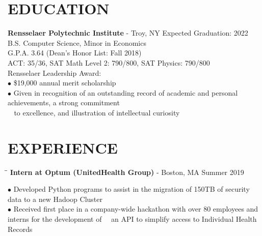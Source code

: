 \documentclass{res}
\begin{document}

\address{\bf  ADDRESS\\11 Riverside Drive, Apt. 7WE\\New York, NY 10023}
\address{\bf Contact Info \\ eli@elischiff.org \\   (646) 574-5224}

\begin{resume}

\vspace{-0.1in}
\section{EDUCATION}
    {\bf Rensselaer Polytechnic Institute} - Troy, NY \hfill Expected Graduation: 2022 \\
    B.S. Computer Science,
    Minor in Economics  \\
    G.P.A. 3.64 (Dean's Honor List: Fall 2018)\\
    ACT: 35/36, SAT Math Level 2: 790/800, SAT Physics: 790/800\\
    Rensselaer Leadership Award: \\
    $\bullet$ \$19,000 annual merit scholarship\\
    $\bullet$ Given in recognition of an outstanding record of academic and personal achievements, a strong
	commitment\\ $~~~~$to excellence, and illustration of intellectual curiosity

\vspace{-0.1in}
\section{EXPERIENCE}
   \vspace{-0.1in}
   \begin{tabbing}
   \hspace{2.3in}\= \hspace{3.8in}\= \kill
    {\bf Intern at Optum (UnitedHealth Group)} - Boston, MA   \>  \>Summer 2019
   \end{tabbing}\vspace{-20pt}
    $\bullet$ Developed Python programs to assist in the migration of 150TB of security data to a new Hadoop Cluster\\
    $\bullet$ Received first place in a company-wide hackathon with over 80 employees and interns for the development of $~~~$ an API to simplify access to Individual Health Records
    \vspace{-15pt}


\end{resume}
\end{document}
